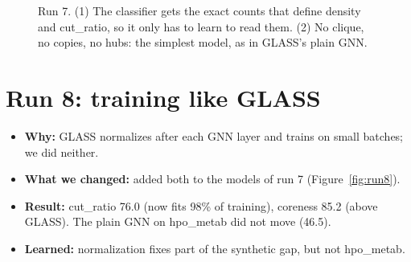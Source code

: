\documentclass[11pt]{article}
\begin{document}
\begin{figure}[H]
\centering
{}
\caption{Run 7. (1) The classifier gets the exact counts that define density and cut\_ratio, so
it only has to learn to read them. (2) No clique, no copies, no hubs: the simplest model, as in
GLASS's plain GNN.}
\label{fig:run7}
\end{figure}

\section*{Run 8: training like GLASS}
\begin{itemize}
  \item \textbf{Why:} GLASS normalizes after each GNN layer and trains on small batches; we did neither.
  \item \textbf{What we changed:} added both to the models of run 7 (Figure~\ref{fig:run8}).
  \item \textbf{Result:} cut\_ratio 76.0 (now fits 98\% of training), coreness 85.2 (above GLASS). The plain GNN on hpo\_metab did not move (46.5).
  \item \textbf{Learned:} normalization fixes part of the synthetic gap, but not hpo\_metab.
\end{itemize}
\end{document}
